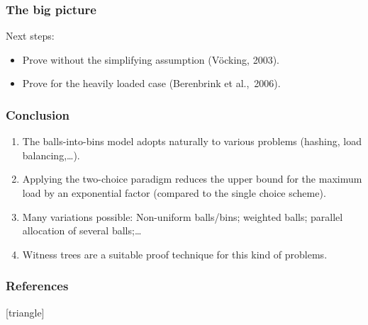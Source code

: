 \documentclass[serif,professionalfonts]{beamer}
\begin{document}
\begin{frame}
\frametitle{The big picture}
\theoremVocking
\assumptionOne
\medskip 
Next steps:
\begin{itemize}
\item Prove \alert{without} the simplifying assumption (V\"ocking, 2003).
\item Prove for the \alert{heavily loaded} case (Berenbrink et al.,~2006).
\end{itemize}
\end{frame}

\begin{frame}
\frametitle{Conclusion}
\begin{enumerate}
\item The balls-into-bins model \alert{adopts naturally} to various problems (hashing, load balancing,\dots).
\item Applying the two-choice paradigm reduces the upper bound for the maximum load by an \alert{exponential factor} (compared to the single choice scheme).
\item \alert{Many variations} possible: Non-uniform balls/bins; weighted balls; parallel allocation of several balls;\dots
\item \alert{Witness trees} are a suitable proof technique for this kind of problems.
\end{enumerate}
\end{frame}

\begin{frame}
\frametitle{References}
\nocite{VOC03}
\nocite{ABKU99}
\nocite{RS98}
\nocite{BCSV06}
\nocite{capocelli1990generalized}
[triangle]
\printbibliography[keyword=main]
\bigskip

\printbibliography[notkeyword=main]
\end{frame}
\end{document}
